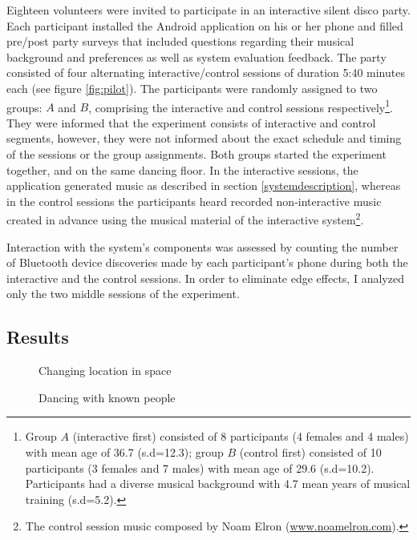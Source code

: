 \documentclass[a4paper,11pt]{article}
\begin{document}
{Eighteen volunteers were invited to participate in an interactive silent disco party.
Each participant installed the Android application on his or her phone and filled pre/post party surveys that included questions regarding their musical background and preferences as well as system evaluation feedback.
The party consisted of four alternating interactive/control sessions of duration 5:40 minutes each (see figure \ref{fig:pilot}).
The participants were randomly assigned to two groups: $A$ and $B$, comprising the interactive and control sessions respectively\footnote{Group $A$ (interactive first) consisted of 8 participants (4 females and 4 males) with mean age of 36.7 (s.d=12.3); group $B$ (control first) consisted of 10 participants (3 females and 7 males) with mean age of 29.6 (s.d=10.2). Participants had a diverse musical background with 4.7 mean years of musical training (s.d=5.2).}.
They were informed that the experiment consists of interactive and control segments, however, they were not informed about the exact schedule and timing of the sessions or the group assignments.
Both groups started the experiment together, and on the same dancing floor.
In the interactive sessions, the application generated music as described in section \ref{systemdescription}, whereas in the control sessions the participants heard recorded non-interactive music created in advance using the musical material of the interactive system\footnote{The control session music composed by Noam Elron (\href{http://www.noamelron.com}{www.noamelron.com}).}.

Interaction with the system's components was assessed by counting the number of Bluetooth device discoveries made by each participant's phone during both the interactive and the control sessions.
In order to eliminate edge effects, I analyzed only the two middle sessions of the experiment.

\subsection{Results}

\begin{figure}[!htb]
	\def\svgwidth{0.95\columnwidth}
  	
	\caption{Changing location in space}\label{fig:location}
\endminipage\hfill
{}
	\def\svgwidth{0.95\columnwidth}
	
	\caption{Dancing with known people}\label{fig:known}
\endminipage\hfill
\end{figure}

}
\end{document}
